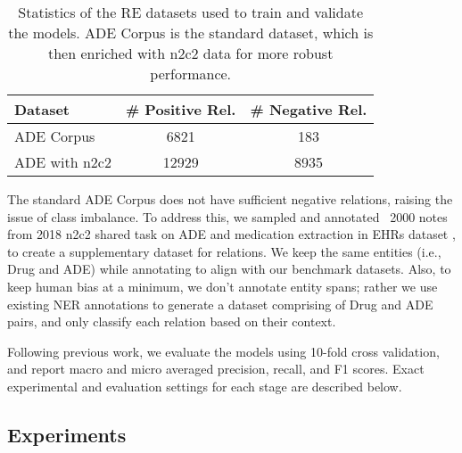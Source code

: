 \documentclass[letterpaper]{article}
\begin{document}
\begin{table}[ht]
\centering
\begin{tabular}{lcc}
\toprule
 \textbf{Dataset} & \textbf{\# Positive Rel.} & \textbf{\# Negative Rel.}\\
\midrule
 ADE Corpus & 6821 & 183 \\ 
 ADE with n2c2 & 12929 & 8935\\
\bottomrule
\end{tabular}
\caption{Statistics of the RE datasets used to train and validate the models. ADE Corpus is the standard dataset, which is then enriched with n2c2 data for more robust performance.}
\label{tab:re_data_stats}
\end{table}

The standard ADE Corpus does not have sufficient negative relations, raising the issue of class imbalance. To address this, we sampled and annotated ~2000 notes from 2018 n2c2 shared task on ADE and medication extraction in EHRs dataset \cite{henry20202018}, to create a supplementary dataset for relations. We keep the same entities (i.e., Drug and ADE) while annotating to align with our benchmark datasets. Also, to keep human bias at a minimum, we don't annotate entity spans; rather we use existing NER annotations to generate a dataset comprising of Drug and ADE pairs, and only classify each relation based on their context.

Following previous work, we evaluate the models using 10-fold cross validation, and report macro and micro averaged precision, recall, and F1 scores. Exact experimental and evaluation settings for each stage are described below.

\subsection{Experiments}
\end{document}

